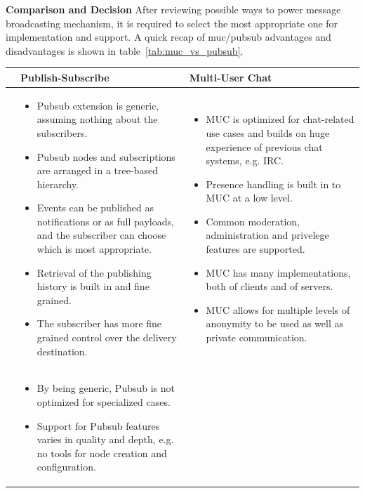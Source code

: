 \textbf{Comparison and Decision}
\newline
After reviewing possible ways to power message broadcasting mechanism, it is required to select the most appropriate one for implementation and support. A quick recap of muc/pubsub advantages and disadvantages is shown in table~\ref{tab:muc_vs_pubsub}.

\begin{table}[H]
	\centering
	\begin{tabular}{|L{0.5cm}|L{7.5cm}|L{7.5cm}|}
	\hline
	\textbf{}		& \textbf{Publish-Subscribe} & \textbf{Multi-User Chat} \\
	\hline
	\hline 
	&  \begin{itemize}
		\item Pubsub extension is generic, assuming nothing about the subscribers.
		\item Pubsub nodes and subscriptions are arranged in a tree-based hierarchy.
		\item Events can be published as notifications or as full payloads, and the subscriber can choose which is most appropriate.
		\item Retrieval of the publishing history is built in and fine grained.
		\item The subscriber has more fine grained control over the delivery destination. 
		\end{itemize}
	& \begin{itemize}
		\item MUC is optimized for chat-related use cases and builds on huge experience of previous chat systems, e.g. IRC.
		\item Presence handling is built in to MUC at a low level.
		\item Common moderation, administration and privelege features are supported.
		\item MUC has many implementations, both of clients and of servers.
		\item MUC allows for multiple levels of anonymity to be used as well as private communication.
		\end{itemize}\\
	\hline
	&  \begin{itemize}
		\item By being generic, Pubsub is not optimized for specialized cases.
		\item Support for Pubsub features varies in quality and depth, e.g. no tools for node creation and configuration.

\end{itemize}
\end{tabular}
\end{table}
